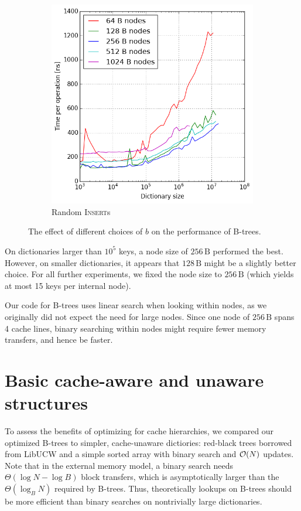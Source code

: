 \begin{figure}
\begin{subfigure}[t]{0.45\textwidth}
	\includegraphics[width=\textwidth]{img/btree-b-insert}
	\caption{Random \textsc{Insert}s}
\end{subfigure}
\caption{The effect of different choices of $b$ on the performance of B-trees.}
\label{fig:btree-b-perf}
\end{figure}

On dictionaries larger than $10^5$ keys, a node size of $256\,\text{B}$
performed the best. However, on smaller dictionaries, it appears that
$128\,\text{B}$ might be a slightly better choice.
For all further experiments, we fixed the node size to $256\,\text{B}$
(which yields at most 15 keys per internal node).

Our code for B-trees uses linear search when looking within nodes,
as we originally did not expect the need for large nodes.
Since one node of $256\,\text{B}$ spans 4 cache lines, binary searching
within nodes might require fewer memory transfers, and hence be faster.

\section{Basic cache-aware and unaware structures}
To assess the benefits of optimizing for cache hierarchies, we compared
our optimized B-trees to simpler, cache-unaware dictiories:
red-black trees borrowed from LibUCW and a simple sorted array with binary
search and $\mathcal{O}(N)$ updates.
Note that in the external memory model, a binary search needs
$\Theta(\log N-\log B)$ block transfers, which is asymptotically larger than
the $\Theta(\log_B N)$ required by B-trees. Thus, theoretically lookups
on B-trees should be more efficient than binary searches on nontrivially
large dictionaries.

